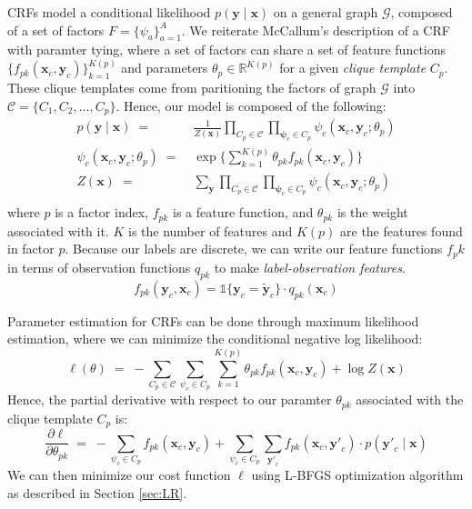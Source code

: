 \documentclass{article}
\begin{document}
CRFs model a conditional likelihood $p(\mathbf{y} \mid \mathbf{x})$ on a general
graph $\mathcal{G}$, composed of a set of factors
$F = \{ \psi_a \} _{a=1}^{A}$. We reiterate McCallum's description
of a CRF with paramter tying, where a set of factors can share a set of feature
functions $\{f_{pk}\left(\mathbf{x}_c, \mathbf{y}_c \right)\}_{k=1}^{K(p)}$ and
parameters $\theta_p \in \mathbb{R}^{K(p)}$ for a given \textit{clique template}
$C_p$. These clique templates come from paritioning the factors of graph
$\mathcal{G}$ into $\mathcal{C} = \{C_1, C_2, \hdots, C_p \}$. Hence, our model
is composed of the following:
\begin{equation}
  \begin{aligned}
    p(\mathbf{y} \mid \mathbf{x}) \; = \; & \frac{1}{Z(\mathbf{x})} \prod_{C_p \in \mathcal{C}} \prod_{\mathbf{\psi}_c \in C_p} \psi_c (\mathbf{x}_c, \mathbf{y}_c ; \theta_p) \\
    \psi_c (\mathbf{x}_c, \mathbf{y}_c ; \theta_p ) \; = \; & \exp \Bigg\{ \sum_{k=1}^{K(p)} \theta_{pk} f_{pk} (\mathbf{x}_c, \mathbf{y}_c) \Bigg\} \\
    Z(\mathbf{x}) \; = \; & \sum_{\mathbf{y}} \prod_{C_p \in \mathcal{C}} \prod_{\mathbf{\psi}_c \in C_p} \psi_c (\mathbf{x}_c, \mathbf{y}_c ; \theta_p) \\
  \end{aligned}
\end{equation}
where $p$ is a factor index, $f_{pk}$ is a feature function, and $\theta_{pk}$ is the
weight associated with it. $K$ is the number of features and $K(p)$ are the
features found in factor $p$.
Because our labels are discrete, we can write our
feature functions $f_pk$ in terms of observation functions $q_{pk}$ to make
\textit{label-observation features}.
\begin{equation}
  f_{pk} (\mathbf{y}_c, \mathbf{x}_c) = \mathds{1} \{\mathbf{y}_c = \mathbf{\widetilde{y}}_c\} \cdot q_{pk}(\mathbf{x}_c)
\end{equation}

Parameter estimation for CRFs can be done through maximum likelihood estimation,
where we can minimize the conditional negative log likelihood:
\begin{equation}
  \ell (\theta) \; = \; - \sum_{C_p \in \mathcal{C}} \sum_{\psi_c \in C_p} \sum_{k=1}^{K(p)} \theta_{pk} f_{pk} (\mathbf{x}_c, \mathbf{y}_c) + \log Z(\mathbf{x})
\end{equation}
Hence, the partial derivative with respect to our paramter $\theta_{pk}$ associated
with the clique template $C_p$ is:
\begin{equation}
  \frac{\partial \ell}{\partial \theta_{pk}} \; = \; - \sum_{\psi_c \in C_p} f_{pk} (\mathbf{x}_c, \mathbf{y}_c) + \sum_{\psi_c \in C_p} \sum_{\mathbf{y'}_c} f_{pk} (\mathbf{x}_c, \mathbf{y'}_c) \cdot p(\mathbf{y'}_c \mid \mathbf{x})
\end{equation}
We can then minimize our cost function $\ell$ using L-BFGS optimization
algorithm as described in Section \ref{sec:LR}.
\end{document}

